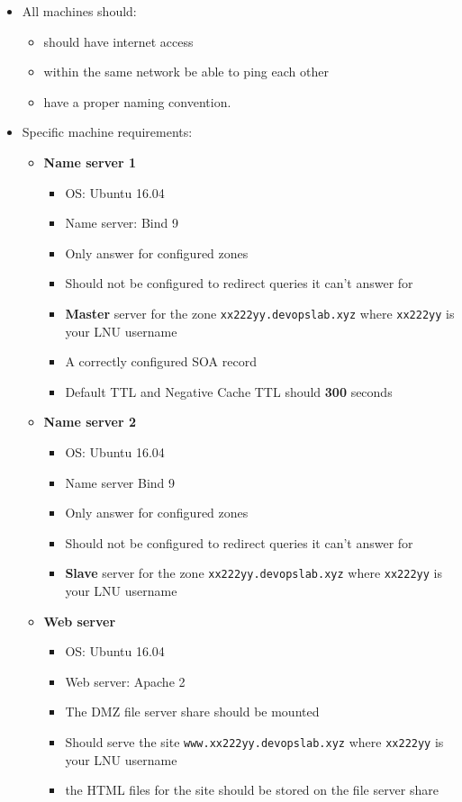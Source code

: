 \documentclass[paper=a4, fontsize=11pt]{report} %
\begin{document}
\begin{itemize}
    \item All machines should:
    \begin{itemize}
		\item should have internet access
		\item within the same network be able to ping each other
    	\item have a proper naming convention.
    \end{itemize}
	\item Specific machine requirements:
    \begin{itemize}
        \item \textbf{Name server 1}
        \begin{itemize}
			\item OS: Ubuntu 16.04
			\item Name server: Bind 9
			\item Only answer for configured zones
			\item Should not be configured to redirect queries it can't answer for
			\item \textbf{Master} server for the zone \texttt{xx222yy.devopslab.xyz} where \texttt{xx222yy} is your LNU username
			\item A correctly configured SOA record
			\item Default TTL and Negative Cache TTL should \textbf{300} seconds
        \end{itemize}  
        \item \textbf{Name server 2}
        \begin{itemize}
			\item OS: Ubuntu 16.04
			\item Name server Bind 9
			\item Only answer for configured zones
			\item Should not be configured to redirect queries it can't answer for
			\item \textbf{Slave} server for the zone \texttt{xx222yy.devopslab.xyz} where \texttt{xx222yy} is your LNU username
        \end{itemize}   
        \item \textbf{Web server}
        \begin{itemize}
			\item OS: Ubuntu 16.04
			\item Web server: Apache 2
			\item The DMZ file server share should be mounted
			\item Should serve the site \texttt{www.xx222yy.devopslab.xyz} where \texttt{xx222yy} is your LNU username
			\item the HTML files for the site should be stored on the file server share
        \end{itemize}  

    \end{itemize}
\end{itemize}
\end{document}
